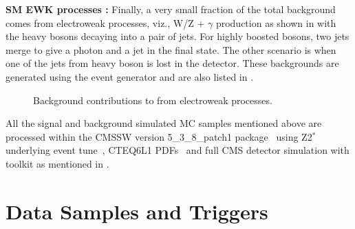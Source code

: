 {\bf SM EWK processes : } Finally, a very small fraction of the total background comes from electroweak processes, viz., W/Z + $\gamma$ production as 
shown in \fig{\ref{fig:qstarBkgEWK}} with the heavy bosons decaying into a pair of jets. For highly boosted bosons, two jets merge to give a photon
 and a jet in the final state. The other scenario is when one of the jets from heavy boson is lost in the detector. These backgrounds are generated 
using the \madgraph event generator and are also listed in \tab{\ref{Table:BkgSamples}}.

\begin{figure}[h!]
\centering
 \caption{Background contributions to \gamjet from electroweak processes.}
\label{fig:qstarBkgEWK}
\end{figure}

All the signal and background simulated MC samples mentioned above are processed within the \gls{CMSSW} version 5\_3\_8\_patch1 
package~\cite{Web:cmssw,cmsTDR} using Z2$^\ast$ underlying event tune~\cite{Chatrchyan:2011id,Field:2010bc}, CTEQ6L1 PDFs~\cite{Pumplin:2002vw,Martin:2009iq} and full CMS detector 
simulation with \geant toolkit as mentioned in \chap{\ref{ch:EventGenSim}}.

\section{Data Samples and Triggers}

